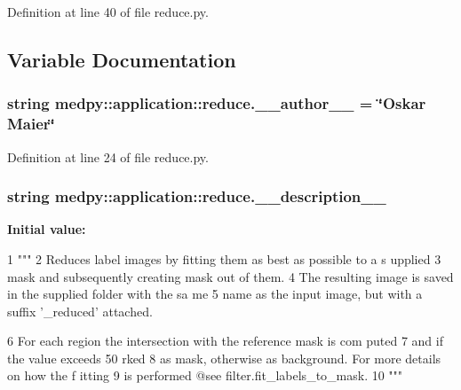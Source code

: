 Definition at line 40 of file reduce.py.



\subsection{Variable Documentation}
\hypertarget{namespacemedpy_1_1application_1_1reduce_a9ae41e540d9256bf2d38f70707610645}{
\subsubsection[{\_\-\_\-author\_\-\_\-}]{\setlength{\rightskip}{0pt plus 5cm}string {\bf medpy::application::reduce.\_\-\_\-author\_\-\_\-} = \char`\"{}Oskar Maier\char`\"{}}}
\label{namespacemedpy_1_1application_1_1reduce_a9ae41e540d9256bf2d38f70707610645}


Definition at line 24 of file reduce.py.

\hypertarget{namespacemedpy_1_1application_1_1reduce_ae797a4fab76411403ac07aa369504edd}{
\subsubsection[{\_\-\_\-description\_\-\_\-}]{\setlength{\rightskip}{0pt plus 5cm}string {\bf medpy::application::reduce.\_\-\_\-description\_\-\_\-}}}
\label{namespacemedpy_1_1application_1_1reduce_ae797a4fab76411403ac07aa369504edd}
{\bfseries Initial value:}
\begin{DoxyCode}
1 """
2                   Reduces label images by fitting them as best as possible to a s
      upplied
3                   mask and subsequently creating mask out of them.
4                   The resulting image is saved in the supplied folder with the sa
      me
5                   name as the input image, but with a suffix '_reduced' attached.
      
6                   For each region the intersection with the reference mask is com
      puted
7                   and if the value exceeds 50%
      rked
8                   as mask, otherwise as background. For more details on how the f
      itting
9                   is performed @see filter.fit_labels_to_mask.
10                   """
\end{DoxyCode}


